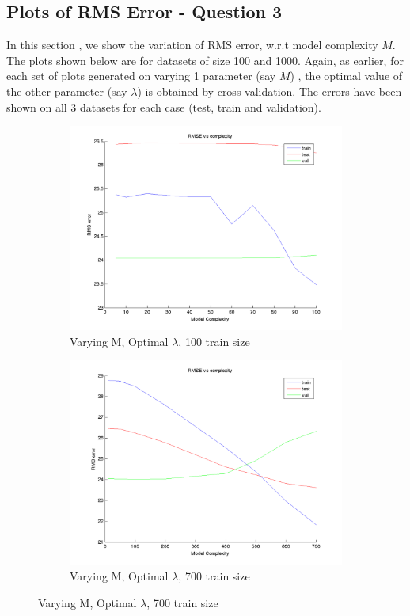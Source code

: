 \documentclass{article}
\begin{document}
\subsection{Plots of RMS Error - Question 3}

In this section , we show the variation of RMS error, w.r.t model complexity $M$. The plots shown below are for datasets of size 100 and 1000.
Again, as earlier, for each set of plots generated on varying 1 parameter (say $M$) , the optimal value of the other parameter (say $\lambda$) is obtained by cross-validation. 
The errors have been shown on all 3 datasets for each case (test, train and validation). 

\begin{figure}[H]

\begin{subfigure}{.5\textwidth}
\centering
\includegraphics[width=\linewidth]{D2/RMS_complexity_100}
\caption{Varying M, Optimal $\lambda$, 100 train size}
\end{subfigure}
\begin{subfigure}{.5\textwidth}
\includegraphics[width=\linewidth]{D2/RMS_complexity_700}
\caption{Varying M, Optimal $\lambda$, 700 train size}
\end{subfigure}



\end{figure}
\end{document}
